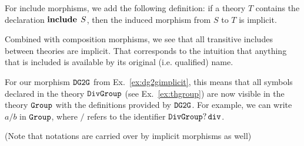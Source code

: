 \begin{example}\label{impl:incl}
For include morphisms, we add the following definition: if a theory $T$ contains the declaration $\operatorname{\mathbf{include}}{\;S}$, then the induced morphism from $S$ to $T$ is implicit.

Combined with composition morphisms, we see that all transitive includes between theories are implicit.
That corresponds to the intuition that anything that is included is available by its original (i.e. qualified) name.
\end{example}

\begin{example}
	For our morphism $\operatorname{\mathtt{DG2G}}$ from Ex.~\ref{ex:dg2gimplicit}, this means that all symbols declared in the theory $\operatorname{\mathtt{DivGroup}}$ (see Ex.~\ref{ex:thgroup}) are now visible in the theory $\operatorname{\mathtt{Group}}$ with the definitions provided by $\operatorname{\mathtt{DG2G}}$.
	For example, we can write $a/b$ in $\operatorname{\mathtt{Group}}$, where $/$ refers to the identifier $\operatorname{\mathtt{DivGroup}}?\operatorname{\mathtt{div}}$.
	
	(Note that notations are carried over by implicit morphisms as well)
\end{example}

